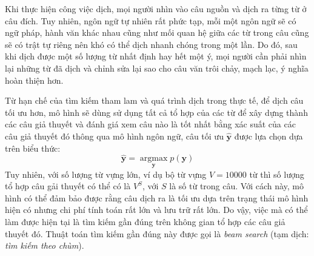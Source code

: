 Khi thực hiện công việc dịch, mọi người nhìn vào câu nguồn và dịch ra từng từ ở câu đích. Tuy nhiên, ngôn ngữ tự nhiên rất phức tạp, mỗi một ngôn ngữ sẽ có ngữ pháp, hành văn khác nhau cũng như mối quan hệ giữa các từ trong câu cũng sẽ có trật tự riêng nên khó có thể dịch nhanh chóng trong một lần. Do đó, sau khi dịch được một số lượng từ nhất định hay hết một ý, mọi người cần phải nhìn lại những từ đã dịch và chỉnh sửa lại sao cho câu văn trôi chảy, mạch lạc, ý nghĩa hoàn thiện hơn.

Từ hạn chế của tìm kiếm tham lam và quá trình dịch trong thực tế, để dịch câu tối ưu hơn, mô hình sẽ dùng sử dụng tất cả tổ hợp của các từ để xây dựng thành các câu giả thuyết và đánh giá xem câu nào là tốt nhất bằng xác suất của các câu giả thuyết đó thông qua mô hình ngôn ngữ, câu tối ưu $\bm{\hat{y}}$ được lựa chọn dựa trên biểu thức:
\begin{equation*}
\bm{\hat{y}} = \operatorname*{argmax}_{\bm{y}} p(\bm{y})
\end{equation*}
Tuy nhiên, với số lượng từ vựng lớn, ví dụ bộ từ vựng $V = 10000$ từ thì số lượng tổ hợp câu gải thuyết có thể có là $V^S$, với $S$ là số từ trong câu. Với cách này, mô hình có thể đảm bảo được rằng câu dịch ra là tối ưu dựa trên trạng thái mô hình hiện có nhưng chi phí tính toán rất lớn và lưu trữ rất lớn. Do vậy, việc mà có thể làm được hiện tại là tìm kiếm gần đúng trên không gian tổ hợp các câu giả thuyết đó. Thuật toán tìm kiếm gần đúng này được gọi là \textit{beam search} (tạm dịch: \textit{tìm kiếm theo chùm}).

